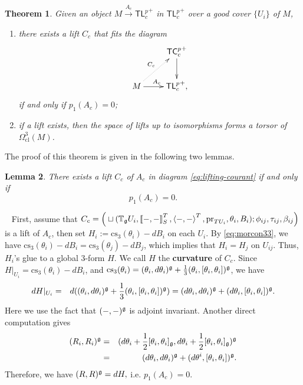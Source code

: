 \documentclass[letterpaper,10pt, oneside]{article} %
\newtheorem{thm}{Theorem}[section]
\newtheorem{lem}[thm]{Lemma}\newtheorem{lemma}[thm]{Lemma}
\newcommand{\tlp}{{\mathsf{TL}^{p}_{c}}} %
\newcommand{\tcalgdp}{{\mathsf{TC}^{p}_{c}}} %
\newcommand{\tagui}{{\mathbb{T}_\g U_i}}
\newcommand{\cl}{\mathrm{cl}}
\newcommand{\pf}{\noindent{\bf Proof.}\ }
\newcommand{\cs}{\mathrm{cs}}
\newcommand{\half}{\frac{1}{2}}
\newcommand{\pair}[1]{\left\langle #1\right\rangle}
\newcommand{\Courant}[1]{\left\llbracket  #1\right\rrbracket }
\newcommand{\pr}{\mathrm{pr}}
\begin{document}
\begin{thm} \label{thm:lift-courant}
  Given an object $M\xrightarrow{A_c} \tlp^+$ in $\tlp^+$ over a good cover $\{U_i\}$ of $M$,
  \begin{enumerate}
      \item[\rm(i)] there exists a lift $C_c$ that fits the diagram
  \begin{equation} \label{eq:lifting-courant}
\xymatrix{
&\tcalgdp^+\ar[d]\\
M \ar@{.>}[ur]^{C_c}\ar[r]^{A_c}&\tlp^+,
}
\end{equation}
if and only if $p_1(A_c)=0$;
\item[\rm(ii)] if a lift exists, then the space of lifts up to isomorphisms forms a torsor of $\Omega^3_{\cl}(M)$.
  \end{enumerate}
\end{thm}
The proof of this theorem is given in the following two lemmas.
\begin{lem}\label{lem:Pexact}
There exists a lift $C_c$ of $A_c$ in diagram \eqref{eq:lifting-courant} if and only if
  $$p_1(A_c)=0.$$
\end{lem}
\pf
First, assume that $C_c=\Big(\sqcup(\tagui, \Courant{-,-}^T_S,  \pair{-,-}^T,\pr_{TU_i},\theta_i,B_i);\phi_{ij},\tau_{ij},\beta_{ij} \Big) $ is a lift of $A_c$, then set $H_i:=\cs_3(\theta_i)-dB_i$ on each $U_i$. By \eqref{eq:morcon33}, we have $\cs_3(\theta_i)-dB_i=\cs_3(\theta_j)-dB_j$, which implies that $H_i=H_j$ on $U_{ij}$. Thus, $H_i$'s glue to a global $3$-form $H$. We call $H$ the {\bf curvature} of $C_c$.
Since $H|_{U_i}=\cs_3(\theta_i)-dB_i$, and $\cs_3(\theta_i)=(\theta_i, d\theta_i)^\g+\frac{1}{3} (\theta_i, [\theta_i, \theta_i])^\g$, we have
\begin{eqnarray*}
  dH|_{U_i} &=&d((\theta_i,d\theta_i)^\mathfrak g+\frac{1}{3}(\theta_i,[\theta_i,\theta_i])^\mathfrak g)
  =(d\theta_i,d\theta_i)^\mathfrak g+ (d\theta_i,[\theta_i,\theta_i])^\mathfrak g.
\end{eqnarray*}
Here we use the fact that $(-,-)^\mathfrak g$ is adjoint invariant. Another direct computation gives
\begin{eqnarray*}
  (R_i,R_i)^\g&=&(d\theta_i+\half[\theta_i,\theta_i]_\g,d\theta_i+\half[\theta_i,\theta_i]_\g)^\g\\
  &=&(d\theta_i,d\theta_i)^\g+ (d\theta^i,[\theta_i,\theta_i])^\g.
\end{eqnarray*}
Therefore, we have $(R,R)^\mathfrak g=dH,$ i.e. $p_1(A_c)=0.$
\end{document}
